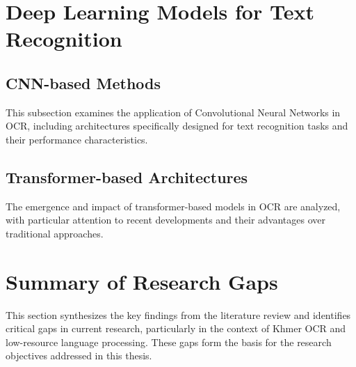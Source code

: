 \section{Deep Learning Models for Text Recognition}
\label{sec:dl-models}

\subsection{CNN-based Methods}
\label{subsec:cnn}
This subsection examines the application of Convolutional Neural Networks in OCR, including architectures specifically designed for text recognition tasks and their performance characteristics.

\subsection{Transformer-based Architectures}
\label{subsec:transformer}
The emergence and impact of transformer-based models in OCR are analyzed, with particular attention to recent developments and their advantages over traditional approaches.

\section{Summary of Research Gaps}
\label{sec:gaps}
This section synthesizes the key findings from the literature review and identifies critical gaps in current research, particularly in the context of Khmer OCR and low-resource language processing. These gaps form the basis for the research objectives addressed in this thesis.
